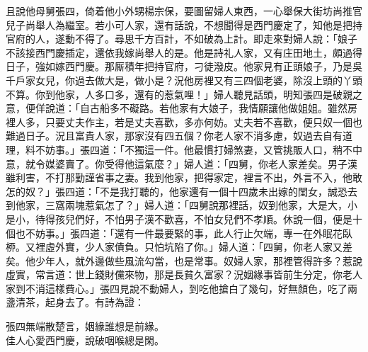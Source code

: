且說他母舅張四，倚着他小外甥楊宗保，要圖留婦人東西，一心舉保大街坊尚推官兒子尚舉人為繼室。若小可人家，還有話說，不想聞得是西門慶定了，知他是把持官府的人，遂動不得了。尋思千方百計，不如破為上計。即走來對婦人說：「娘子不該接西門慶插定，還依我嫁尚舉人的是。他是詩礼人家，又有庄田地土，頗過得日子，強如嫁西門慶。那厮積年把持官府，刁徒潑皮。{}他家見有正頭娘子，乃是吳千戶家女兒，你過去做大是，做小是？況他房裡又有三四個老婆，除沒上頭的丫頭不算。你到他家，人多口多，還有的惹氣哩！」婦人聽見話頭，明知張四是破親之意，{}便佯說道：「自古船多不礙路。若他家有大娘子，我情願讓他做姐姐。雖然房裡人多，只要丈夫作主，若是丈夫喜歡，多亦何妨。丈夫若不喜歡，便只奴一個也難過日子。況且富貴人家，那家沒有四五個？你老人家不消多慮，奴過去自有道理，料不妨事。」張四道：「不獨這一件。他最慣打婦煞妻，又管挑販人口，稍不中意，就令媒婆賣了。{}你受得他這氣麼？」婦人道：「四舅，你老人家差矣。男子漢雖利害，不打那勤謹省事之妻。我到他家，把得家定，裡言不出，外言不入，他敢怎的奴？」張四道：「不是我打聽的，他家還有一個十四歲未出嫁的閨女，誠恐去到他家，三窩兩塊惹氣怎了？」{}婦人道：「四舅說那裡話，奴到他家，大是大，小是小，待得孩兒們好，不怕男子漢不歡喜，不怕女兒們不孝順。休說一個，便是十個也不妨事。」張四道：「還有一件最要緊的事，此人行止欠端，專一在外眠花臥桺。又裡虛外實，少人家債負。只怕坑陷了你。」婦人道：「四舅，你老人家又差矣。他少年人，就外邊做些風流勾當，也是常事。奴婦人家，那裡管得許多？{}惹說虛實，常言道：世上錢財儻來物，那是長貧久富家？況姻緣事皆前生分定，你老人家到不消這樣費心。」張四見說不動婦人，到吃他搶白了幾句，好無顏色，吃了兩盞清茶，{}起身去了。有詩為證：

\begin{myquote} 
張四無端散楚言，姻緣誰想是前緣。\\佳人心愛西門慶，說破咽喉總是閑。
\end{myquote} 

